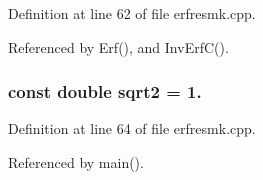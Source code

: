 Definition at line 62 of file erfresmk.\-cpp.



Referenced by Erf(), and Inv\-Erf\-C().

\subsubsection[{sqrt2}]{\setlength{\rightskip}{0pt plus 5cm}const double sqrt2 = 1.\hspace{0.3cm}{\ttfamily [static]}}\label{toolboxes_2rnd_2erfresmk_8cpp_a3e5855ac613bbea79256e42f7ba59a98}


Definition at line 64 of file erfresmk.\-cpp.



Referenced by main().

